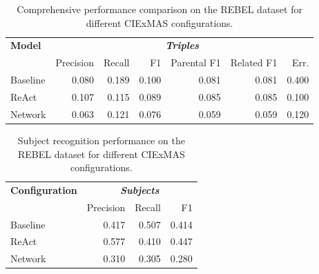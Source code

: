 \documentclass[a4paper,oneside,bibliography=totoc]{scrbook}
\begin{document}
\begin{table}[h]
  \centering
  \begin{tabular}{l|rrrrrr}
    \toprule
    \textbf{Model} & \multicolumn{6}{c}{\textit{\textbf{Triples}}}                                                     \\
                   & Precision                                     & Recall & F1    & Parental F1 & Related F1 & Err.  \\
    \midrule
    Baseline       & 0.080                                         & 0.189  & 0.100 & 0.081       & 0.081      & 0.400 \\
    ReAct          & 0.107                                         & 0.115  & 0.089 & 0.085       & 0.085      & 0.100 \\
    Network        & 0.063                                         & 0.121  & 0.076 & 0.059       & 0.059      & 0.120 \\
    \bottomrule
  \end{tabular}
  \caption{Comprehensive performance comparison on the REBEL dataset for different CIExMAS configurations.}
  \label{tab:rebel_comprehensive_results}
\end{table}

\begin{table}[h]
  \centering
  \begin{tabular}{l|rrr}
    \toprule
    \textbf{Configuration} & \multicolumn{3}{c}{\textit{\textbf{Subjects}}}                  \\
                           & Precision                                      & Recall & F1    \\
    \midrule
    Baseline               & 0.417                                          & 0.507  & 0.414 \\
    ReAct                  & 0.577                                          & 0.410  & 0.447 \\
    Network                & 0.310                                          & 0.305  & 0.280 \\
    \bottomrule
  \end{tabular}
  \caption{Subject recognition performance on the REBEL dataset for different CIExMAS configurations.}
  \label{tab:rebel_subjects}
\end{table}
\end{document}
